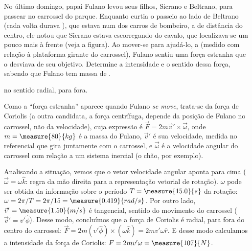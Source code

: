 \begin{question}
	No último domingo, papai Fulano levou seus filhos, Sicrano e Beltrano, para passear no carrossel do parque.
	Enquanto curtia o passeio ao lado de Beltrano (cada volta durava ), que estava num dos carros de bombeiro, a  de distância do centro, ele notou que Sicrano estava escorregando do cavalo, que localizava-se um pouco mais à frente (veja a figura).
	Ao mover-se para ajudá-lo, a  (medido com relação à plataforma girante do carrossel), Fulano sentiu uma força estranha que o desviava de seu objetivo.
	Determine a intensidade e o sentido dessa força, sabendo que Fulano tem massa de .


	\begin{answer}
		 no sentido radial, para fora.
	\end{answer}

	\begin{solution}
		Como a ``força estranha'' aparece quando Fulano \emph{se move}, trata-se da força de Coriolis (a outra candidata, a força centrífuga, depende da posição de Fulano no carrossel, não da velocidade), cuja expressão é $\vec F = 2m\vec v' \times \vec \omega$, onde $m = \measure{80}{kg}$ é a massa do Fulano, $\vec v'$ é sua velocidade, medida no referencial que gira juntamente com o carrossel, e $\vec\omega$ é a velocidade angular do carrossel com relação a um sistema inercial (o chão, por exemplo).

		Analisando a situação, vemos que o vetor velocidade angular aponta para cima ($\vec\omega = \omega\hat k$: regra da mão direita para a representação vetorial de rotação). $\omega$ pode ser obtida da informação sobre o período $T = \measure{15.0}{s}$ da rotação: $\omega = 2\pi/T = 2\pi/15 = \measure{0.419}{rad/s}$. Por outro lado, $\vec v' = \measure{1.50}{m/s}$ é tangencial, sentido do movimento do carrossel ($\vec v' = v'\hat \phi$).
		Desse modo, concluímos que a força de Coriolis é radial, para fora do centro do carrossel: $\vec F = 2m(v'\hat \phi)\times(\omega \hat k) = 2mv'\omega \hat r$. E desse modo calculamos a intensidade da força de Coriolis: $F = 2mv'\omega = \measure{107}{N}$.
	\end{solution}
\end{question}